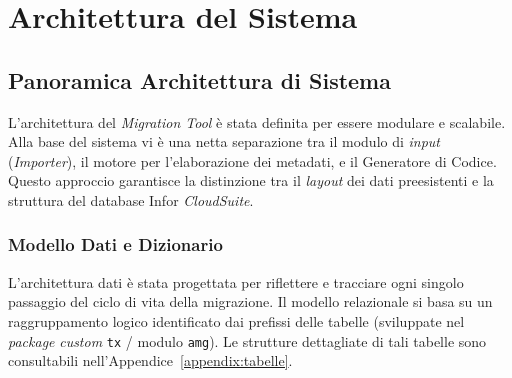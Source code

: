 \chapter{Architettura del Sistema}\label{ch:architettura-del-sistema}


\section{Panoramica Architettura di Sistema}\label{sec:panoramica-architettura-di-sistema}
L'architettura del \textit{Migration Tool} è stata definita per essere modulare e scalabile.
Alla base del sistema vi è una netta separazione tra il modulo di \textit{input} (\textit{Importer}), il motore per l'elaborazione dei metadati,
e il Generatore di Codice.
Questo approccio garantisce la distinzione tra il \textit{layout} dei dati preesistenti e la struttura del database Infor \textit{CloudSuite}.

\subsection{Modello Dati e Dizionario}\label{subsec:modello-dati-e-dizionario}
L'architettura dati è stata progettata per riflettere e tracciare ogni singolo passaggio del ciclo di vita della migrazione.
Il modello relazionale si basa su un raggruppamento logico identificato dai prefissi delle tabelle
(sviluppate nel \textit{package} \textit{custom} \texttt{tx} / modulo \texttt{amg}).
Le strutture dettagliate di tali tabelle sono consultabili nell'Appendice~\ref{appendix:tabelle}.


